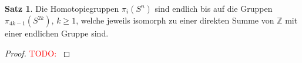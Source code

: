 \documentclass[11pt, a4paper, german]{article}
\theoremstyle{definition}
\newtheorem{satz}{Satz}
\theoremstyle{remark}
\newcommand{\TODO}[1]{\textcolor{red}{TODO: #1}} %
\newcommand{\Z}{\mathbb{Z}} %
\begin{document}
\begin{satz}
  Die Homotopiegruppen $\pi_i(S^n)$ sind endlich bis auf die Gruppen $\pi_{4k-1}(S^{2k})$, $k \geq 1$, welche jeweils isomorph zu einer direkten Summe von $\Z$ mit einer endlichen Gruppe sind.
\end{satz}

\begin{proof}
  \TODO{}
\end{proof}


\end{document}
